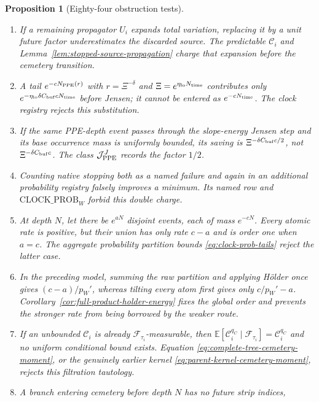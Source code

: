 \documentclass[11pt]{article}
\newtheorem{proposition}[theorem]{Proposition}
\begin{document}
\begin{proposition}[Eighty-four obstruction tests]
\begin{enumerate}[label=\textup{(T\arabic*)}]
      mass $e^{-qN}$.  Its probability tail has rate $q$, but its current
      has only rate $q-a$.  Equation \eqref{eq:cemetery-kernel-domination}
      rejects the missing envelope.
\item If a remaining propagator $U_i$ expands total variation, replacing it
      by a unit future factor underestimates the discarded source.  The
      predictable $\mathcal C_i$ and
      Lemma~\ref{lem:stopped-source-propagation} charge that expansion before
      the cemetery transition.
\item A tail $e^{-cN_{\rm PPE}(r)}$ with $r=\Xi^{-\delta}$ and
      $\Xi=e^{\eta_{\rm lo}N_{\rm time}}$ contributes only
      $e^{-\eta_{\rm lo}\delta C_{\rm buf}cN_{\rm time}}$ before Jensen; it
      cannot be entered as $e^{-cN_{\rm time}}$.  The clock registry rejects
      this substitution.
\item If the same PPE-depth event passes through the slope-energy Jensen
      step and its base occurrence mass is uniformly bounded, its saving is
      $\Xi^{-\delta C_{\rm buf}c/2}$, not
      $\Xi^{-\delta C_{\rm buf}c}$.  The class
      $\mathcal J_{\rm PPE}^{J}$ records the factor $1/2$.
\item Counting native stopping both as a named failure and again in an
      additional probability registry falsely improves a minimum.  Its
      named row and \(\mathrm{CLOCK\_PROB}_{W}\) forbid this double charge.
\item At depth $N$, let there be $e^{aN}$ disjoint events, each of mass
      $e^{-cN}$.  Every atomic rate is positive, but their union has only
      rate $c-a$ and is order one when $a=c$.  The aggregate probability
      partition bounds \eqref{eq:clock-prob-tails} reject the latter case.
\item In the preceding model, summing the raw partition and applying
      H\"older once gives $(c-a)/p_W'$, whereas tilting every atom first gives
      only $c/p_W'-a$.  Corollary~\ref{cor:full-product-holder-energy}
      fixes the global order and prevents the stronger rate from being
      borrowed by the weaker route.
\item If an unbounded $\mathcal C_i$ is already
      $\mathcal F_{\tau_i}$-measurable, then
      $\mathbb E[\mathcal C_i^{q_C}\mid\mathcal F_{\tau_i}]
      =\mathcal C_i^{q_C}$ and no uniform conditional bound exists.
      Equation \eqref{eq:complete-tree-cemetery-moment}, or the genuinely
      earlier kernel \eqref{eq:parent-kernel-cemetery-moment}, rejects this
      filtration tautology.
\item A branch entering cemetery before depth $N$ has no future strip indices,

\end{enumerate}
\end{proposition}
\end{document}
